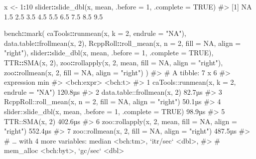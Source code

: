 \documentclass[
]{krantz}
\makeatletter
\newenvironment{Shaded}{\begin{snugshade}}{\end{snugshade}}
\newcommand{\CommentTok}[1]{\textcolor[rgb]{0.56,0.35,0.01}{\textit{#1}}}
\newcommand{\DataTypeTok}[1]{\textcolor[rgb]{0.13,0.29,0.53}{#1}}
\newcommand{\DecValTok}[1]{\textcolor[rgb]{0.00,0.00,0.81}{#1}}
\newcommand{\KeywordTok}[1]{\textcolor[rgb]{0.13,0.29,0.53}{\textbf{#1}}}
\newcommand{\NormalTok}[1]{#1}
\newcommand{\OperatorTok}[1]{\textcolor[rgb]{0.81,0.36,0.00}{\textbf{#1}}}
\newcommand{\OtherTok}[1]{\textcolor[rgb]{0.56,0.35,0.01}{#1}}
\newcommand{\StringTok}[1]{\textcolor[rgb]{0.31,0.60,0.02}{#1}}
\newenvironment{kframe}{%
\medskip{}
\setlength{\fboxsep}{.8em}
 \def\at@end@of@kframe{}%
 \ifinner\ifhmode%
  \def\at@end@of@kframe{\end{minipage}}%
  \begin{minipage}{\columnwidth}%
 \fi\fi%
 \def\FrameCommand##1{\hskip\@totalleftmargin \hskip-\fboxsep
 \colorbox{shadecolor}{##1}\hskip-\fboxsep
     \hskip-\linewidth \hskip-\@totalleftmargin \hskip\columnwidth}%
 \MakeFramed {\advance\hsize-\width
   \@totalleftmargin\z@ \linewidth\hsize
   \@setminipage}}%
 {\par\unskip\endMakeFramed%
 \at@end@of@kframe}
\renewenvironment{Shaded}{\begin{kframe}}{\end{kframe}}
\renewcommand{\KeywordTok} [1]{\textcolor[rgb]{0.00,0.44,0.13}{{#1}}}
\renewcommand{\DataTypeTok}[1]{\textcolor[rgb]{0.56,0.13,0.00}{{#1}}}
\renewcommand{\DecValTok}  [1]{\textcolor[rgb]{0.25,0.63,0.44}{{#1}}}
\renewcommand{\StringTok}  [1]{\textcolor[rgb]{0.25,0.44,0.63}{{#1}}}
\renewcommand{\CommentTok} [1]{\textcolor[rgb]{0.38,0.63,0.69}{{#1}}}
\renewcommand{\OtherTok}   [1]{\textcolor[rgb]{0.00,0.44,0.13}{{#1}}}
\renewcommand{\NormalTok}  [1]{{#1}}
\makeatother
\begin{document}
\begin{Shaded}
\begin{Highlighting}[]
\NormalTok{x <-}\StringTok{ }\DecValTok{1}\OperatorTok{:}\DecValTok{10}
\NormalTok{slider}\OperatorTok{::}\KeywordTok{slide_dbl}\NormalTok{(x, mean, }\DataTypeTok{.before =} \DecValTok{1}\NormalTok{, }\DataTypeTok{.complete =} \OtherTok{TRUE}\NormalTok{)}
\CommentTok{#>  [1]  NA 1.5 2.5 3.5 4.5 5.5 6.5 7.5 8.5 9.5}

\NormalTok{bench}\OperatorTok{::}\KeywordTok{mark}\NormalTok{(}
\NormalTok{  caTools}\OperatorTok{::}\KeywordTok{runmean}\NormalTok{(x, }\DataTypeTok{k =} \DecValTok{2}\NormalTok{, }\DataTypeTok{endrule =} \StringTok{"NA"}\NormalTok{),}
\NormalTok{  data.table}\OperatorTok{::}\KeywordTok{frollmean}\NormalTok{(x, }\DecValTok{2}\NormalTok{),}
\NormalTok{  RcppRoll}\OperatorTok{::}\KeywordTok{roll_mean}\NormalTok{(x, }\DataTypeTok{n =} \DecValTok{2}\NormalTok{, }\DataTypeTok{fill =} \OtherTok{NA}\NormalTok{, }\DataTypeTok{align =} \StringTok{"right"}\NormalTok{),}
\NormalTok{  slider}\OperatorTok{::}\KeywordTok{slide_dbl}\NormalTok{(x, mean, }\DataTypeTok{.before =} \DecValTok{1}\NormalTok{, }\DataTypeTok{.complete =} \OtherTok{TRUE}\NormalTok{),}
\NormalTok{  TTR}\OperatorTok{::}\KeywordTok{SMA}\NormalTok{(x, }\DecValTok{2}\NormalTok{),}
\NormalTok{  zoo}\OperatorTok{::}\KeywordTok{rollapply}\NormalTok{(x, }\DecValTok{2}\NormalTok{, mean, }\DataTypeTok{fill =} \OtherTok{NA}\NormalTok{, }\DataTypeTok{align =} \StringTok{"right"}\NormalTok{),}
\NormalTok{  zoo}\OperatorTok{::}\KeywordTok{rollmean}\NormalTok{(x, }\DecValTok{2}\NormalTok{, }\DataTypeTok{fill =} \OtherTok{NA}\NormalTok{, }\DataTypeTok{align =} \StringTok{"right"}\NormalTok{)}
\NormalTok{)}
\CommentTok{#> # A tibble: 7 x 6}
\CommentTok{#>   expression                                                    min}
\CommentTok{#>   <bch:expr>                                                <bch:t>}
\CommentTok{#> 1 caTools::runmean(x, k = 2, endrule = "NA")                120.8µs}
\CommentTok{#> 2 data.table::frollmean(x, 2)                                82.7µs}
\CommentTok{#> 3 RcppRoll::roll_mean(x, n = 2, fill = NA, align = "right")  50.1µs}
\CommentTok{#> 4 slider::slide_dbl(x, mean, .before = 1, .complete = TRUE)  98.9µs}
\CommentTok{#> 5 TTR::SMA(x, 2)                                            402.6µs}
\CommentTok{#> 6 zoo::rollapply(x, 2, mean, fill = NA, align = "right")    552.4µs}
\CommentTok{#> 7 zoo::rollmean(x, 2, fill = NA, align = "right")           487.5µs}
\CommentTok{#> # … with 4 more variables: median <bch:tm>, `itr/sec` <dbl>,}
\CommentTok{#> #   mem_alloc <bch:byt>, `gc/sec` <dbl>}
\end{Highlighting}
\end{Shaded}
\end{document}
